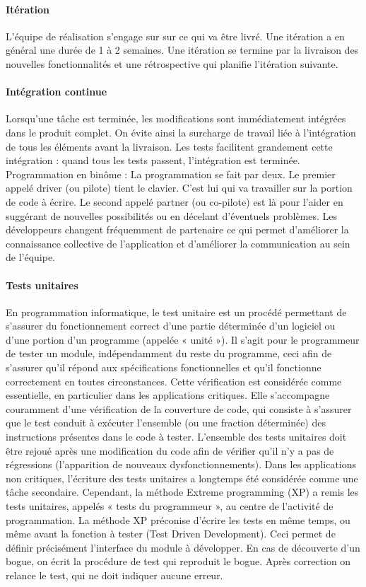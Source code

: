 \paragraph{Itération}
L'équipe de réalisation s'engage sur sur ce qui va être livré. Une itération a en général une durée de 1 à 2 semaines. Une itération se termine par la livraison des nouvelles fonctionnalités et une rétrospective qui planifie l'itération suivante.

\paragraph{Intégration continue}
Lorsqu'une tâche est terminée, les modifications sont immédiatement intégrées dans le produit complet. On évite ainsi la surcharge de travail liée à l'intégration de tous les éléments avant la livraison. Les tests facilitent grandement cette intégration : quand tous les tests passent, l'intégration est terminée. 
Programmation en bin\^ome : La programmation se fait par deux. Le premier appelé driver (ou pilote) tient le clavier. C'est lui qui va travailler sur la portion de code à écrire. Le second appelé partner (ou co-pilote) est là pour l'aider en suggérant de nouvelles possibilités ou en décelant d'éventuels problèmes. Les développeurs changent fréquemment de partenaire ce qui permet d'améliorer la connaissance collective de l'application et d'améliorer la communication au sein de l'équipe. 

\paragraph{Tests unitaires}
En programmation informatique, le test unitaire est un procédé permettant de s'assurer du fonctionnement correct d'une partie déterminée d'un logiciel ou d'une portion d'un programme (appelée « unité »).
Il s'agit pour le programmeur de tester un module, indépendamment du reste du programme, ceci afin de s'assurer qu'il répond aux spécifications fonctionnelles et qu'il fonctionne correctement en toutes circonstances. Cette vérification est considérée comme essentielle, en particulier dans les applications critiques. Elle s'accompagne couramment d'une vérification de la couverture de code, qui consiste à s'assurer que le test conduit à exécuter l'ensemble (ou une fraction déterminée) des instructions présentes dans le code à tester.
L'ensemble des tests unitaires doit être rejoué après une modification du code afin de vérifier qu'il n'y a pas de régressions (l'apparition de nouveaux dysfonctionnements).
Dans les applications non critiques, l'écriture des tests unitaires a longtemps été considérée comme une tâche secondaire. Cependant, la méthode Extreme programming (XP) a remis les tests unitaires, appelés « tests du programmeur », au centre de l'activité de programmation.
La méthode XP préconise d'écrire les tests en même temps, ou même avant la fonction à tester (Test Driven Development). Ceci permet de définir précisément l'interface du module à développer. En cas de découverte d'un bogue, on écrit la procédure de test qui reproduit le bogue. Après correction on relance le test, qui ne doit indiquer aucune erreur.
